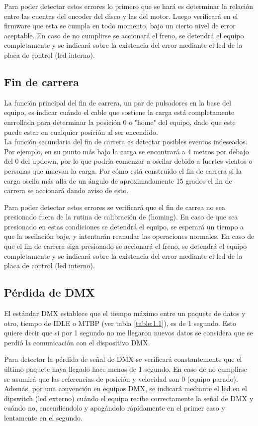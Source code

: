 Para poder detectar estos errores lo primero que se hará es determinar la relación entre las cuentas del encoder del disco y las del motor. Luego verificará en el firmware que esta se cumpla en todo momento, bajo un cierto nivel de error aceptable. En caso de no cumplirse se accionará el freno, se detendrá el equipo completamente y se indicará sobre la existencia del error mediante el led de la placa de control (led interno).

\subsection{Fin de carrera}
La función principal del fin de carrera, un par de pulsadores en la base del equipo, es indicar cuándo el cable que sostiene la carga está completamente enrrollada para determinar la posición 0 o "home" del equipo, dado que este puede estar en cualquier posición al ser encendido.\\
La función secundaria del fin de carrera es detectar posibles eventos indeseados. Por ejemplo, en su punto más bajo la carga se encontrará a 4 metros por debajo del 0 del updown, por lo que podría comenzar a oscilar debido a fuertes vientos o personas que muevan la carga. Por cómo está construido el fin de carrera si la carga oscila más alla de un ángulo de aproximadamente 15 grados el fin de carrera se accionará dando aviso de esto.

Para poder detectar estos errores se verificará que el fin de carrea no sea presionado fuera de la rutina de calibración de (homing). En caso de que sea presionado en estas condiciones se detendrá el equipo, se esperará un tiempo a que la oscilación baje, y intentarán reanudar las operaciones normales. En caso de que el fin de carrera siga presionado se accionará el freno, se detendrá el equipo completamente y se indicará sobre la existencia del error mediante el led de la placa de control (led interno).


\subsection{Pérdida de DMX}
El estándar DMX establece que el tiempo máximo entre un paquete de datos y otro, tiempo de IDLE o MTBP (ver tabla \ref{table:1.1}), es de 1 segundo. Esto quiere decir que si por 1 segundo no me llegaron nuevos datos se considera que se perdió la comunicación con el dispositivo DMX.

Para detectar la pérdida de señal de DMX se verificará constantemente que el último paquete haya llegado hace menos de 1 segundo. En caso de no cumplirse se asumirá que las referencias de posición y velocidad son 0 (equipo parado). Además, por una convención en equipos DMX, se indicará mediante el led en el dipswitch (led externo) cuándo el equipo recibe correctamente la señal de DMX y cuándo no, encendiendolo y apagándolo rápidamente en el primer caso y lentamente en el segundo.


